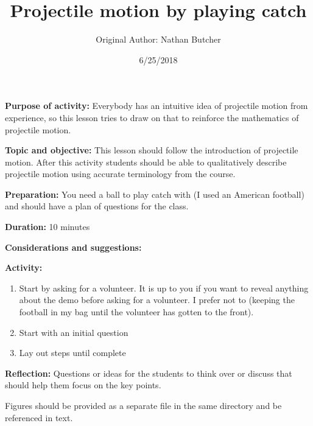\documentclass{article}
\title{Projectile motion by playing catch}
\author{Original Author: Nathan Butcher}
\date{6/25/2018}
\begin{document}
\maketitle
\thispagestyle{empty}

\textbf{Purpose of activity:}  Everybody has an intuitive idea of projectile motion from experience, so this lesson tries to draw on that to reinforce the mathematics of projectile motion.

\textbf{Topic and objective:} This lesson should follow the introduction of projectile motion. After this activity students should be able to qualitatively describe projectile motion using accurate terminology from the course. 

\textbf{Preparation:} You need a ball to play catch with (I used an American football) and should have a plan of questions for the class. 

\textbf{Duration:} 10 minutes 

\textbf{Considerations and suggestions:}

\hspace{14pt}

\textbf{Activity:}
\begin{enumerate}
\item Start by asking for a volunteer. It is up to you if you want to reveal anything about the demo before asking for a volunteer. I prefer not to (keeping the football in my bag until the volunteer has gotten to the front).
\item Start with an initial question
\item Lay out steps until complete
\end{enumerate}

\textbf{Reflection:} Questions or ideas for the students to think over or discuss that should help them focus on the key points.

\hspace{14pt}

Figures should be provided as a separate file in the same directory and be referenced in text.
\end{document}
